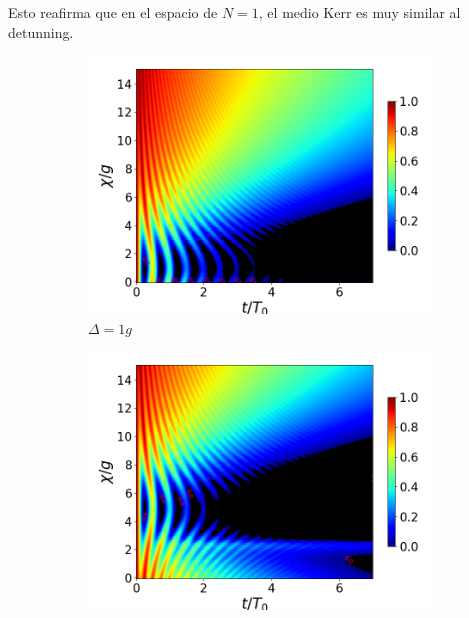 Esto reafirma que en el espacio de $N=1$, el medio Kerr es muy similar al detunning. 

\begin{figure}[h!]
    \centering
    \begin{subfigure}{0.49\textwidth}
        \includegraphics[width=\textwidth]{figuras/ch4/concu/chi/eg0+ge0 d=1.0g k=0.0g J=0.0g gamma=0.25g concu chi dis.png}
        \caption{$\Delta=1g$}
        \label{fig4:concu x d1}
    \end{subfigure}
    \hfill
    \begin{subfigure}{0.49\textwidth}
        \includegraphics[width=\textwidth]{figuras/ch4/concu/chi/eg0+ge0 d=5.0g k=0.0g J=0.0g gamma=0.25g concu chi dis.png}

\end{subfigure}
\end{figure}
